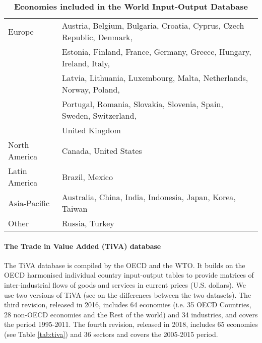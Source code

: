 \documentclass[11pt,a4paper]{article}
\begin{document}
 
\begin{table}[!h]
\begin{threeparttable}
\centering
\centering
\caption{\small{\textbf{Economies included in the World Input-Output Database}}}
\small
\begin{tabular}{ll}
\hline\hline
Europe & Austria, Belgium, Bulgaria, Croatia, Cyprus, Czech Republic, Denmark,\\
& Estonia, Finland, France, Germany, Greece, Hungary, Ireland, Italy,\\
& Latvia, Lithuania, Luxembourg, Malta, Netherlands, Norway, Poland,\\
&Portugal, Romania, Slovakia, Slovenia, Spain, Sweden, Switzerland,\\
& United Kingdom\\
North  America& Canada, United States\\
Latin America & Brazil, Mexico \\
Asia-Pacific & Australia, China, India, Indonesia, Japan, Korea, Taiwan\\
Other & Russia, Turkey\\
\hline\hline
\end{tabular} 
\label{tab:wiod}
\end{threeparttable}
\end{table} 
\paragraph{The Trade in Value Added (TiVA) database}
The TiVA database is compiled by the OECD and the WTO. It builds on the OECD harmonised individual country input-output tables to provide matrices of inter-industrial flows of goods and services in current prices (U.S. dollars).
We use two versions of TiVA (see \cite{OECD2018} on the differences between the two datasets).
The third revision, released in 2016, includes 64 economies (i.e. 35 OECD Countries, 28 non-OECD economies and the Rest of the world) and 34 industries, and covers the period 1995-2011.
The fourth revision, released in 2018, includes 65 economies (see Table \ref{tab:tiva}) and 36 sectors and covers the 2005-2015 period.
\end{document}

